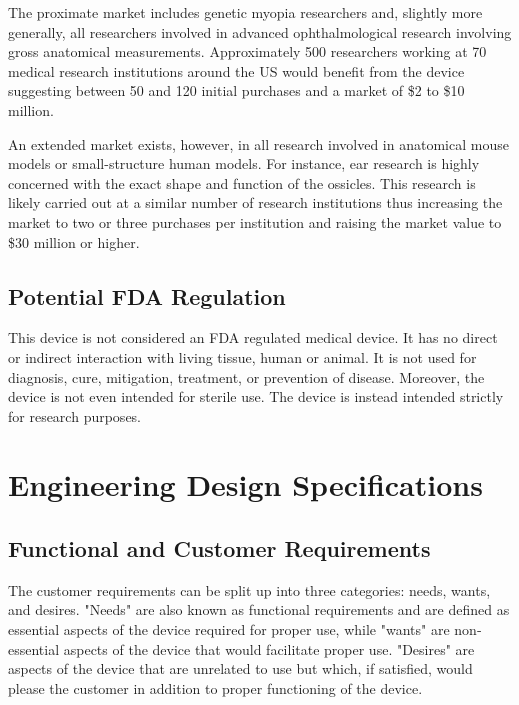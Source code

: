 \documentclass{article}
\begin{document}
The proximate market includes genetic myopia researchers and, slightly
more generally, all researchers involved in advanced ophthalmological
research involving gross anatomical measurements. Approximately 500
researchers working at 70 medical research institutions around the US
would benefit from the device suggesting between 50 and 120 initial
purchases and a market of \$2 to \$10 million.

An extended market exists, however, in all research involved in
anatomical mouse models or small-structure human models. For instance,
ear research is highly concerned with the exact shape and function of
the ossicles. This research is likely carried out at a similar number
of research institutions thus increasing the market to two or three
purchases per institution and raising the market value to \$30 million
or higher.

\subsection{Potential FDA Regulation}
\label{sec:potent-fda}

This device is not considered an FDA regulated medical device. It has
no direct or indirect interaction with living tissue, human or
animal. It is not used for diagnosis, cure, mitigation, treatment, or
prevention of disease. Moreover, the device is not even intended for
sterile use. The device is instead intended strictly for research
purposes.

\section{Engineering Design Specifications}
\subsection{Functional and Customer Requirements}
The customer requirements can be split up into three categories: needs, wants, and desires. "Needs" are also known as functional requirements and are defined as essential aspects of the device required for proper use, while "wants" are non‐essential aspects of the device that would facilitate proper use. "Desires" are aspects of the device that are unrelated to use but which, if satisfied, would please the customer in addition to proper functioning of the device.  
\end{document}
